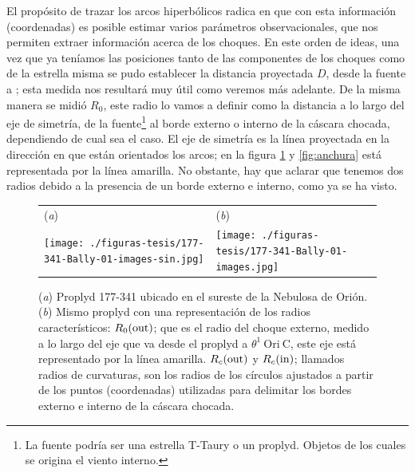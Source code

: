 El propósito de trazar los arcos hiperbólicos radica en que con esta información (coordenadas) es posible estimar varios parámetros observacionales, que nos permiten extraer información acerca de los choques. En este orden de ideas, una vez que ya teníamos las posiciones tanto de las componentes de los choques como de la estrella misma se pudo establecer la distancia proyectada \(D\), desde la fuente a \thC{}; esta medida nos resultará muy útil como veremos más adelante. De la misma manera se midió \(R_{0}\), este radio lo vamos a definir como la distancia a lo largo del eje de simetría, de la fuente\footnote{La fuente podría ser una estrella T-Taury o un proplyd. Objetos de los cuales se origina el viento interno.} \citep{Robberto:2005}  al borde externo o interno de la cáscara chocada, dependiendo de cual sea el caso. El eje de simetría es la línea proyectada en la dirección en que están orientados los arcos; en la figura \ref{fig:radios} y \ref{fig:anchura} está representada por la línea amarilla. No obstante, hay que aclarar que tenemos dos radios debido a la presencia de un borde externo e interno, como ya se ha visto. \\ 

\begin{figure}[htp]
\centering
\begin{tabular}{l l}
(\textit{a}) & (\textit{b})  \\
  \texttt{[image: ./figuras-tesis/177-341-Bally-01-images-sin.jpg]}&
 \texttt{[image: ./figuras-tesis/177-341-Bally-01-images.jpg]}\\
\end{tabular}
\caption{(\textit{a}) Proplyd 177-341 ubicado en el sureste de la Nebulosa de Orión. (\textit{b}) Mismo proplyd con una representación de los radios característicos: \(R_{0}(\mathrm{out}{})\); que es el radio del choque externo, medido a lo largo del eje que va desde el proplyd a \(\theta^1\ \text{Ori}\ \text{C}\), este eje está representado por la línea amarilla. \(R_{c}(\mathrm{out}{})\) y \(R_{c}(\mathrm{in}{})\); llamados radios de curvaturas, son los radios de los círculos ajustados a partir de los puntos (coordenadas) utilizadas para delimitar los bordes externo e interno de la cáscara chocada. }\label{fig:radios}
\end{figure}

